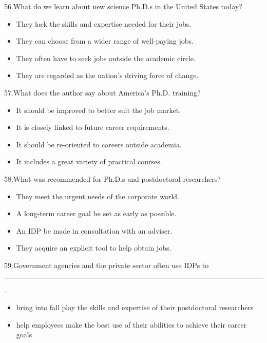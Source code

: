\documentclass[UTF8,11pt]{ctexart}
\begin{document}
56.What do we learn about new science Ph.D.s in the United States today?


\begin{itemize}[leftmargin=2em,itemsep=.2em,topsep=.4em]\item[A.] They lack the skills and expertise needed for their jobs.
\item[B.] They can choose from a wider range of well-paying jobs.
\item[C.] They often have to seek jobs outside the academic circle.
\item[D.] They are regarded as the nation’s driving force of change.
\end{itemize}

57.What does the author say about America’s Ph.D. training?


\begin{itemize}[leftmargin=2em,itemsep=.2em,topsep=.4em]\item[A.] It should be improved to better suit the job market.
\item[B.] It is closely linked to future career requirements.
\item[C.] It should be re-oriented to careers outside academia.
\item[D.] It includes a great variety of practical courses.
\end{itemize}

58.What was recommended for Ph.D.s and postdoctoral researchers?


\begin{itemize}[leftmargin=2em,itemsep=.2em,topsep=.4em]\item[A.] They meet the urgent needs of the corporate world.
\item[B.] A long-term career goal be set as early as possible.
\item[C.] An IDP be made in consultation with an adviser.
\item[D.] They acquire an explicit tool to help obtain jobs.
\end{itemize}

59.Government agencies and the private sector often use IDPs to\par\noindent\rule{.95\linewidth}{.4pt}\par  .


\begin{itemize}[leftmargin=2em,itemsep=.2em,topsep=.4em]\item[A.] bring into fall play the skills and expertise of their postdoctoral researchers
\item[B.] help employees make the best use of their abilities to achieve their career goals
\end{itemize}
\end{document}
